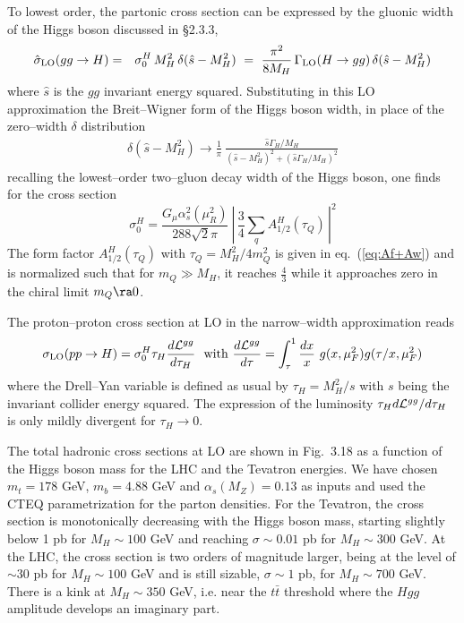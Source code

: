 To lowest order, the partonic cross section can be expressed by the gluonic 
width of the Higgs boson discussed in \S2.3.3,
\begin{eqnarray}
\hat\sigma_{\rm LO} (gg \to H) & = & {\sigma_0^H}\, {M_H^2} \, \delta
(\hat s -M_H^2)  \ = \  \frac{\pi^2}{8 M_H}\,  \Gamma_{\rm LO} (H \to gg) 
\, \delta (\hat s -M_H^2)
\end{eqnarray}
where $\hat{s}$ is the $gg$ invariant energy squared. Substituting in this LO 
approximation the Breit--Wigner form of the Higgs boson width, in place of the 
zero--width $\delta$ distribution 
\begin{eqnarray}
\delta(\hat s - M_H^2) \to \frac{1}{\pi}~\frac{\hat s \Gamma_H/M_H}
{(\hat s - M_H^2)^2 + (\hat s \Gamma_H/M_H)^2}
\end{eqnarray}
recalling the lowest--order two--gluon decay width of the Higgs boson, one 
finds for the cross section \cite{pp-ggH-LO}
\begin{equation}
\sigma_0^H = \frac{G_{\mu}\alpha_{s}^{2}(\mu_R^2)}{288 \sqrt{2}\pi} \
\left| \, \frac{3}{4} \sum_{q} A_{1/2}^H (\tau_{Q}) \, \right|^{2}
\end{equation}
The form factor $A_{1/2}^H (\tau_Q)$ with $\tau_Q = M_H^2/4m_Q^2$ is given in 
eq.~(\ref{eq:Af+Aw}) and is normalized such that for $m_Q \gg M_H$, it reaches 
$\frac{4}{3}$  while it approaches zero in the chiral limit $m_Q \ra 0$.\s

The proton--proton cross section at LO in the narrow--width 
approximation reads
\begin{equation}
\sigma_{\rm LO}(pp\to H) = \sigma_0^H \tau_H \frac{d{\cal L}^{gg}}{d\tau_H}
\ \ {\rm with} \ 
\frac{d{\cal L}^{gg}}{d\tau} = \int_\tau^1 \frac{dx}{x}~g(x,\mu_F^2)
g(\tau /x,\mu_F^2)
\end{equation}
where the Drell--Yan variable is defined as usual by $\tau_H = M^2_H/s$ with 
$s$ being the invariant collider energy squared. The expression of the 
luminosity $\tau_H d {\cal L}^{gg}/d \tau_H$ is only mildly divergent for
$\tau_H \rightarrow 0$.\s 

The total hadronic cross sections at LO are shown in Fig.~3.18 as a function of
the  Higgs boson mass for the LHC and the Tevatron energies. We have
chosen  $m_t=178$ GeV, $m_b=4.88$ GeV and $\alpha_s (M_Z)=0.13$ as inputs and
used the CTEQ parametrization for the parton densities. For the Tevatron, the
cross section is monotonically decreasing with the Higgs boson mass, starting
slightly below  1 pb for $M_H \sim 100$ GeV and reaching $\sigma \sim 0.01$ 
pb for $M_H \sim 300$ GeV. At the LHC, the cross section is two orders of
magnitude larger, being at the level of $\sim 30$ pb for $M_H \sim 100$ GeV 
and is still sizable, $\sigma \sim 1$ pb, for $M_H \sim 700$ GeV. There is a 
kink at $M_H \sim 350$ GeV, i.e. near the $t\bar{t}$ threshold where the $Hgg$ 
amplitude develops an imaginary part. \s 


